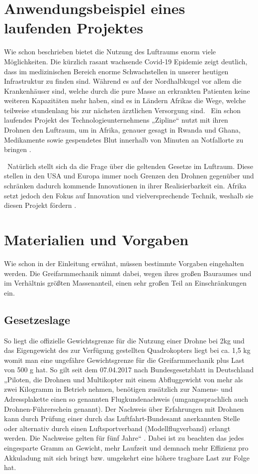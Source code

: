 \section{Anwendungsbeispiel eines laufenden Projektes} 
Wie schon beschrieben bietet die Nutzung des Luftraums enorm viele Möglichkeiten. Die kürzlich rasant wachsende Covid-19 Epidemie zeigt deutlich, dass im medizinischen Bereich enorme Schwachstellen in unserer heutigen Infrastruktur zu finden sind. Während es auf der Nordhalbkugel vor allem die Krankenhäuser sind, welche durch die pure Masse an erkrankten Patienten keine weiteren Kapazitäten mehr haben, sind es in Ländern Afrikas die Wege, welche teilweise stundenlang bis zur nächsten ärztlichen Versorgung sind.
\
Ein schon laufendes Projekt des Technologieunternehmens „Zipline“ nutzt mit ihren Drohnen den Luftraum, um in Afrika, genauer gesagt in Rwanda und Ghana, Medikamente sowie gespendetes Blut innerhalb von Minuten an Notfallorte zu bringen \cite{zipline}.

\
Natürlich stellt sich da die Frage über die geltenden Gesetze im Luftraum. Diese stellen in den USA und Europa immer noch Grenzen den Drohnen gegenüber und schränken dadurch kommende Innovationen in ihrer Realisierbarkeit ein. Afrika setzt jedoch den Fokus auf Innovation und vielversprechende Technik, weshalb sie diesen Projekt fördern \cite{Zipline2}.

\section{Materialien und Vorgaben}

Wie schon in der Einleitung erwähnt, müssen bestimmte Vorgaben eingehalten werden. Die Greifarmmechanik nimmt dabei, wegen ihres großen Bauraumes und im Verhältnis größten Massenanteil, einen sehr großen Teil an Einschränkungen ein.

\subsection{Gesetzeslage}
So liegt die offizielle Gewichtsgrenze für die Nutzung einer Drohne bei 2kg und das Eigengewicht des zur Verfügung gestellten Quadrokopters liegt bei ca. 1,5 kg womit man eine ungefähre Gewichtsgrenze für die Greifarmmechanik plus Last von 500 g hat. So gilt seit dem 07.04.2017 nach Bundesgesetzblatt in Deutschland „Piloten, die Drohnen und Multikopter mit einem Abfluggewicht von mehr als zwei Kilogramm in Betrieb nehmen, benötigen zusätzlich zur Namens- und Adressplakette einen so genannten Flugkundenachweis (umgangssprachlich auch Drohnen-Führerschein genannt). Der Nachweis über Erfahrungen mit Drohnen kann durch Prüfung einer durch das Luftfahrt-Bundesamt anerkannten Stelle oder alternativ durch einen Luftsportverband (Modellflugverband) erlangt werden. Die Nachweise gelten für fünf Jahre“ \cite{Gesetzeslage}. Dabei ist zu beachten das jedes eingesparte Gramm an Gewicht, mehr Laufzeit und demnach mehr Effizienz pro Akkuladung mit sich bringt bzw. umgekehrt eine höhere tragbare Last zur Folge hat.

